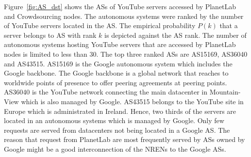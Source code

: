 %

Figure~\ref{fig:AS_dst} shows the ASs of YouTube servers accessed by PlanetLab and Crowdsourcing nodes.
The autonomous systems were ranked by the number of YouTube servers located in the AS.
The empirical probability $P(k)$ that a server belongs to AS with rank $k$ is depicted against the AS rank.
The number of autonomous systems hosting YouTube servers that are accessed by PlanetLab nodes is limited to less than 30.
The top three ranked ASs are AS15169, AS36040 and AS43515.
AS15169 is the Google autonomous system which includes the Google backbone.
The Google backbone is a global network that reaches to worldwide points of presence to offer peering agreements at peering points.
AS36040 is the YouTube network connecting the main datacenter in Mountain-View which is also managed by Google.
AS43515 belongs to the YouTube site in Europe which is administrated in Ireland.
Hence, two thirds of the servers are located in an autonomous systems which is managed by Google.
Only few requests are served from datacenters not being located in a Google AS.
The reason that request from PlanetLab are most frequently served by ASs owned by Google might be a good interconnection of the NRENs to the Google ASs.


